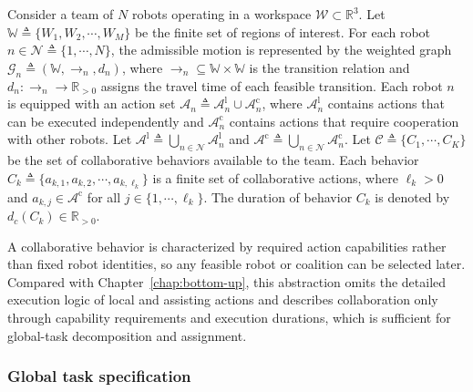 Consider a team of $N$ robots operating in a workspace
$\mathcal{W} \subset \mathbb{R}^{3}$. Let
$\mathbb{W} \triangleq \{W_{1}, W_{2}, \cdots, W_{M}\}$ be the finite set of
regions of interest. For each robot $n \in \mathcal{N} \triangleq
\{1, \cdots, N\}$, the admissible motion is represented by the weighted graph
$\mathcal{G}_{n} \triangleq (\mathbb{W}, \rightarrow_{n}, d_{n})$, where
$\rightarrow_{n} \subseteq \mathbb{W} \times \mathbb{W}$ is the transition
relation and $d_{n} : \rightarrow_{n} \to \mathbb{R}_{>0}$ assigns the travel
time of each feasible transition.
Each robot $n$ is equipped with an action set
$\mathcal{A}_{n} \triangleq \mathcal{A}^{\mathrm{l}}_{n} \cup
\mathcal{A}^{\mathrm{c}}_{n}$, where
$\mathcal{A}^{\mathrm{l}}_{n}$ contains actions that can be executed
independently and $\mathcal{A}^{\mathrm{c}}_{n}$ contains actions that require
cooperation with other robots. Let
$\mathcal{A}^{\mathrm{l}} \triangleq \bigcup_{n \in \mathcal{N}}
\mathcal{A}^{\mathrm{l}}_{n}$ and
$\mathcal{A}^{\mathrm{c}} \triangleq \bigcup_{n \in \mathcal{N}}
\mathcal{A}^{\mathrm{c}}_{n}$. Let
$\mathcal{C} \triangleq \{C_{1}, \cdots, C_{K}\}$ be the set of collaborative
behaviors available to the team. Each behavior
$C_{k} \triangleq \{a_{k,1}, a_{k,2}, \cdots, a_{k,\ell_{k}}\}$ is a finite set
of collaborative actions, where $\ell_{k} > 0$ and
$a_{k,j} \in \mathcal{A}^{\mathrm{c}}$ for all
$j \in \{1, \cdots, \ell_{k}\}$. The duration of behavior $C_{k}$ is denoted by
$d_{c}(C_{k}) \in \mathbb{R}_{>0}$.

A collaborative behavior is characterized by required action capabilities rather
than fixed robot identities, so any feasible robot or coalition can be selected
later. 
Compared with Chapter~\ref{chap:bottom-up}, this abstraction omits the detailed
execution logic of local and assisting actions and describes collaboration only
through capability requirements and execution durations, which is sufficient for
global-task decomposition and assignment.

\subsubsection{Global task specification}
\label{ch04:subsubsec:global_task_spec}

